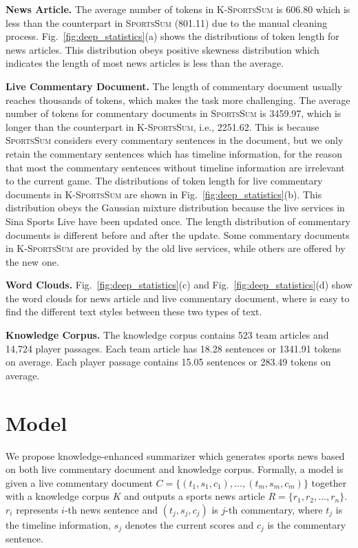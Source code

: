 \vspace{1ex}
\noindent\textbf{News Article.} The average number of tokens in \textsc{K-SportsSum} is 606.80 which is less than the counterpart in \textsc{SportsSum} (801.11) due to the manual cleaning process.
Fig.~\ref{fig:deep_statistics}(a) shows the distributions of token length for news articles.
This distribution obeys positive skewness distribution which indicates the length of most news articles is less than the average.

\vspace{1ex}
\noindent\textbf{Live Commentary Document.} The length of commentary document usually reaches thousands of tokens, which makes the task more challenging.
The average number of tokens for commentary documents in \textsc{SportsSum} is 3459.97, which is longer than the counterpart in \textsc{K-SportsSum}, i.e., 2251.62.
This is because \textsc{SportsSum} considers every commentary sentences in the document, but we only retain the commentary sentences which has timeline information, for the reason that most the commentary sentences without timeline information are irrelevant to the current game.
The distributions of token length for live commentary documents in \textsc{K-SportsSum} are shown in Fig.~\ref{fig:deep_statistics}(b). This distribution obeys the Gaussian mixture distribution because the live services in Sina Sports Live have been updated once. The length distribution of commentary documents is different before and after the update. Some commentary documents in \textsc{K-SportsSum} are provided by the old live services, while others are offered by the new one.

\vspace{1ex}
\noindent\textbf{Word Clouds.}
Fig.~\ref{fig:deep_statistics}(c) and Fig.~\ref{fig:deep_statistics}(d) show the word clouds for news article and live commentary document, where is easy to find the different text styles between these two types of text.

\vspace{1ex}
\noindent\textbf{Knowledge Corpus.}
The knowledge corpus contains 523 team articles and 14,724 player passages.
Each team article has 18.28 sentences or 1341.91 tokens on average. Each player passage contains 15.05 sentences or 283.49 tokens on average.

\section{Model}
We propose knowledge-enhanced summarizer which generates sports news based on both live commentary document and knowledge corpus. Formally, a model is given a live commentary document $C=\{(t_{1},s_{1},c_{1}),...,(t_{m},s_{m},c_{m})\}$ together with a knowledge corpus $K$ and outputs a sports news article $R=\{r_{1},r_{2},...,r_{n}\}$. $r_{i}$ represents $i$-th news sentence and $(t_{j},s_{j},c_{j})$ is $j$-th commentary, where $t_{j}$ is the timeline information, $s_{j}$ denotes the current scores and $c_{j}$ is the commentary sentence.

